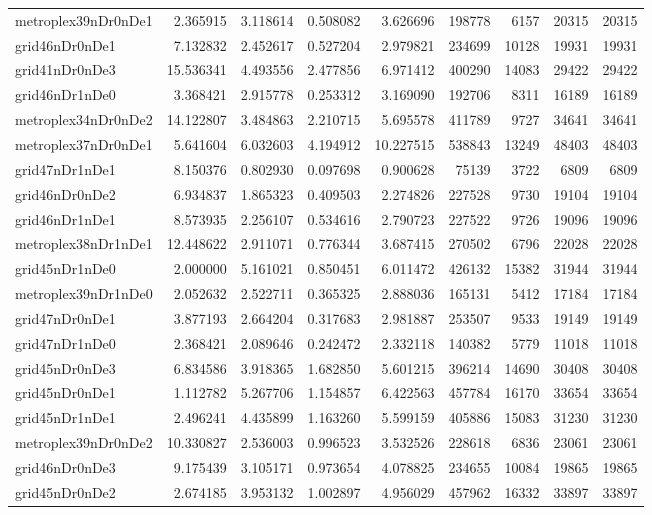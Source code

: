 \begin{longtable}{|l|r|r|r|r|r|r|r|r|}
metroplex39nDr0nDe1 & 2.365915 & 3.118614 & 0.508082 & 3.626696 & 198778 & 6157 & 20315 & 20315 \\
grid46nDr0nDe1 & 7.132832 & 2.452617 & 0.527204 & 2.979821 & 234699 & 10128 & 19931 & 19931 \\
grid41nDr0nDe3 & 15.536341 & 4.493556 & 2.477856 & 6.971412 & 400290 & 14083 & 29422 & 29422 \\
grid46nDr1nDe0 & 3.368421 & 2.915778 & 0.253312 & 3.169090 & 192706 & 8311 & 16189 & 16189 \\
metroplex34nDr0nDe2 & 14.122807 & 3.484863 & 2.210715 & 5.695578 & 411789 & 9727 & 34641 & 34641 \\
metroplex37nDr0nDe1 & 5.641604 & 6.032603 & 4.194912 & 10.227515 & 538843 & 13249 & 48403 & 48403 \\
grid47nDr1nDe1 & 8.150376 & 0.802930 & 0.097698 & 0.900628 & 75139 & 3722 & 6809 & 6809 \\
grid46nDr0nDe2 & 6.934837 & 1.865323 & 0.409503 & 2.274826 & 227528 & 9730 & 19104 & 19104 \\
grid46nDr1nDe1 & 8.573935 & 2.256107 & 0.534616 & 2.790723 & 227522 & 9726 & 19096 & 19096 \\
metroplex38nDr1nDe1 & 12.448622 & 2.911071 & 0.776344 & 3.687415 & 270502 & 6796 & 22028 & 22028 \\
grid45nDr1nDe0 & 2.000000 & 5.161021 & 0.850451 & 6.011472 & 426132 & 15382 & 31944 & 31944 \\
metroplex39nDr1nDe0 & 2.052632 & 2.522711 & 0.365325 & 2.888036 & 165131 & 5412 & 17184 & 17184 \\
grid47nDr0nDe1 & 3.877193 & 2.664204 & 0.317683 & 2.981887 & 253507 & 9533 & 19149 & 19149 \\
grid47nDr1nDe0 & 2.368421 & 2.089646 & 0.242472 & 2.332118 & 140382 & 5779 & 11018 & 11018 \\
grid45nDr0nDe3 & 6.834586 & 3.918365 & 1.682850 & 5.601215 & 396214 & 14690 & 30408 & 30408 \\
grid45nDr0nDe1 & 1.112782 & 5.267706 & 1.154857 & 6.422563 & 457784 & 16170 & 33654 & 33654 \\
grid45nDr1nDe1 & 2.496241 & 4.435899 & 1.163260 & 5.599159 & 405886 & 15083 & 31230 & 31230 \\
metroplex39nDr0nDe2 & 10.330827 & 2.536003 & 0.996523 & 3.532526 & 228618 & 6836 & 23061 & 23061 \\
grid46nDr0nDe3 & 9.175439 & 3.105171 & 0.973654 & 4.078825 & 234655 & 10084 & 19865 & 19865 \\
grid45nDr0nDe2 & 2.674185 & 3.953132 & 1.002897 & 4.956029 & 457962 & 16332 & 33897 & 33897 \\

\end{longtable}
